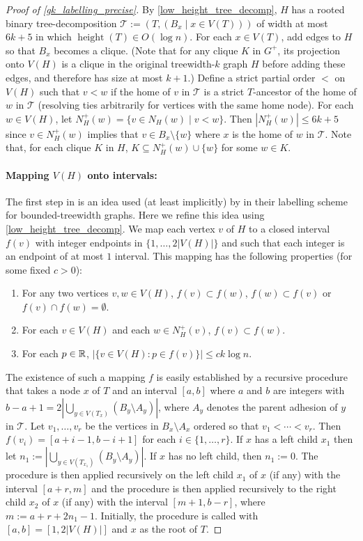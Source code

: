\documentclass{patmorin}
\renewcommand{\le}{\leqslant}
\newcommand{\defin}[1]{\emph{\textcolor{brightmaroon}{#1}}}
\DeclareMathOperator{\height}{height}
\newcommand{\Oh}{O}
\newcommand{\calT}{\mathcal{T}}
\begin{document}
\begin{proof}[Proof of \cref{gk_labelling_precise}]
  By \cref{low_height_tree_decomp}, $H$ has a rooted binary tree-decomposition $\calT:=(T,(B_x\mid x\in V(T)))$ of width at most $6k+5$ in which $\height(T)\in \Oh(\log n)$.   For each $x\in V(T)$, add edges to $H$ so that $B_x$ becomes a clique. (Note that for any clique $K$ in $G^+$, its projection onto $V(H)$ is a clique in the original treewidth-$k$ graph $H$ before adding these edges, and therefore has size at most $k+1$.)  Define a strict partial order $<$ on $V(H)$ such that $v<w$ if the home of $v$ in $\calT$ is a strict $T$-ancestor of the home of $w$ in $\calT$ (resolving ties arbitrarily for vertices with the same home node). For each $w\in V(H)$, let $N^+_H(w)=\{v\in N_H(w)\mid v < w\}$.  Then $|N^+_H(w)|\le 6k+5$ since $v\in N^+_H(w)$ implies that $v\in B_x\setminus\{w\}$ where $x$ is the home of $w$ in $\calT$.  Note that, for each clique $K$ in $H$, $K\subseteq N^+_H(w)\cup\{w\}$ for some $w\in K$. 

  \paragraph{\boldmath Mapping $V(H)$ onto intervals:}
  The first step in \cite{dujmovic.esperet.ea:adjacency} is an idea used (at least implicitly) by \citet{gavoille.labourel:shorter} in their labelling scheme for bounded-treewidth graphs.  Here we refine this idea using \cref{low_height_tree_decomp}.
  We map each vertex $v$ of $H$ to a closed interval \defin{$f(v)$} with integer endpoints in $\{1,\ldots,2|V(H)|\}$ and such that each integer is an endpoint of at most $1$ interval.  This mapping has the following properties (for some fixed $c>0$):
  \begin{enumerate}[nosep,label=(I\arabic*)]
    \item\label{nested_or_disjoint} For any two vertices $v,w\in V(H)$, $f(v)\subset f(w)$, $f(w)\subset f(v)$ or $f(v)\cap f(w)=\emptyset$.
    \item\label{intersection_subgraph} For each $v\in V(H)$ and each $w\in N^+_H(v)$, $f(v)\subset f(w)$.
    \item\label{thin} For each $p\in \mathbb{R}$, $|\{v\in V(H):p\in f(v)\}|\le ck\log n$. 
  \end{enumerate}

  The existence of such a mapping $f$ is easily established by a recursive procedure that takes a node $x$ of $T$ and an interval $[a,b]$ where $a$ and $b$ are integers with $b-a+1=2|\bigcup_{y\in V(T_x)} (B_y\setminus A_y)|$, where $A_y$ denotes the parent adhesion of $y$ in $\calT$. Let $v_1,\ldots,v_r$ be the vertices in $B_x\setminus A_x$ ordered so that $v_1< \cdots< v_r$.  Then $f(v_i)=[a+i-1,b-i+1]$ for each $i\in\{1,\ldots,r\}$.  If $x$ has a left child $x_1$ then let $n_1:=|\bigcup_{y\in V(T_{x_1})} (B_y\setminus A_y)|$. If $x$ has no left child, then $n_1:=0$.  The procedure is then applied recursively on the left child $x_1$ of $x$ (if any) with the interval $[a+r,m]$ and the procedure is then applied recursively to the right child $x_2$ of $x$ (if any) with the interval $[m+1,b-r]$, where $m:=a+r+2n_1-1$.  Initially, the procedure is called with $[a,b]=[1,2|V(H)|]$ and $x$ as the root of $T$.


\end{proof}
\end{document}
